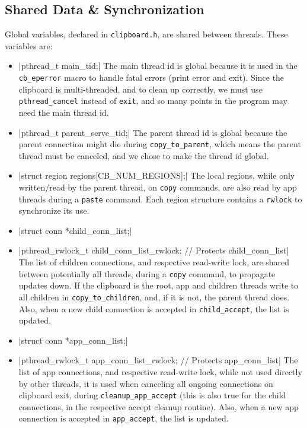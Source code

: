 \documentclass[a4paper, titlepage, english]{article}
\begin{document}
\subsection{Shared Data \& Synchronization}
\par
Global variables, declared in \texttt{clipboard.h}, are shared between threads. These variables are:
\begin{itemize}
	\item {}|pthread_t main_tid;|
	      The main thread id is global because it is used in the \texttt{cb\_eperror} macro to handle fatal errors (print error and exit). Since the clipboard is multi-threaded, and to clean up correctly, we must use \texttt{pthread\_cancel} instead of \texttt{exit}, and so many points in the program may need the main thread id.
	\item {}|pthread_t parent_serve_tid;|
	      The parent thread id is global because the parent connection might die during \texttt{copy\_to\_parent}, which means the parent thread must be canceled, and we chose to make the thread id global.
	\item {}|struct region regions[CB_NUM_REGIONS];|
	      The local regions, while only written/read by the parent thread, on \texttt{copy} commands, are also read by app threads during a \texttt{paste} command. Each region structure contains a \texttt{rwlock} to synchronize its use.
	\item {}|struct conn *child_conn_list;|
	\item {}|pthread_rwlock_t child_conn_list_rwlock; // Protects child_conn_list|
	      The list of children connections, and respective read-write lock, are shared between potentially all threads, during a \texttt{copy} command, to propagate updates down. If the clipboard is the root, app and children threads write to all children in \texttt{copy\_to\_children}, and, if it is not, the parent thread does. Also, when a new child connection is accepted in \texttt{child\_accept}, the list is updated.
	\item {}|struct conn *app_conn_list;|
	\item {}|pthread_rwlock_t app_conn_list_rwlock; // Protects app_conn_list|
	      The list of app connections, and respective read-write lock, while not used directly by other threads, it is used when canceling all ongoing connections on clipboard exit, during \texttt{cleanup\_app\_accept} (this is also true for the child connections, in the respective accept cleanup routine). Also, when a new app connection is accepted in \texttt{app\_accept}, the list is updated.

\end{itemize}
\end{document}
